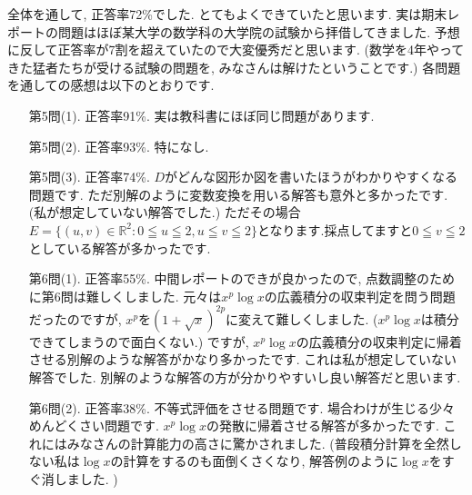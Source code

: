 \documentclass[dvipdfmx,a4paper,11pt]{article}
\newcommand{\R}{\mathbb{R}}
\theoremstyle{definition}
\begin{document}
\hspace{-11pt}{\Large 期末レポートについて}

全体を通して, 正答率72\%でした. とてもよくできていたと思います.
実は期末レポートの問題はほぼ某大学の数学科の大学院の試験から拝借してきました.
予想に反して正答率が7割を超えていたので大変優秀だと思います.
(数学を4年やってきた猛者たちが受ける試験の問題を, みなさんは解けたということです.)
各問題を通しての感想は以下のとおりです.
\begin{itemize}
\item [第5問(1).] 正答率91\%. 実は教科書にほぼ同じ問題があります.
\item [第5問(2).] 正答率93\%. 特になし.
\item [第5問(3).] 正答率74\%. $D$がどんな図形か図を書いたほうがわかりやすくなる問題です.
 ただ別解のように変数変換を用いる解答も意外と多かったです. (私が想定していない解答でした.) ただその場合$E=\{ (u ,v) \in \R^2 : 0 \leqq u \leqq 2,  u \leqq v \leqq 2\}$となります.採点してますと$0 \leqq v \leqq 2$としている解答が多かったです. 
\item [第6問(1).] 正答率55\%. 中間レポートのできが良かったので, 点数調整のために第6問は難しくしました. 
元々は$x^p \log x$の広義積分の収束判定を問う問題だったのですが, $x^p$を$(1+\sqrt{x})^{2p}$に変えて難しくしました. ($x^p \log x$は積分できてしまうので面白くない.)
ですが, $x^p \log x$の広義積分の収束判定に帰着させる別解のような解答がかなり多かったです. 
これは私が想定していない解答でした. 別解のような解答の方が分かりやすいし良い解答だと思います.
\item [第6問(2).] 正答率38\%. 不等式評価をさせる問題です. 場合わけが生じる少々めんどくさい問題です.
$x^p \log x$の発散に帰着させる解答が多かったです.
これにはみなさんの計算能力の高さに驚かされました.
(普段積分計算を全然しない私は$\log x$の計算をするのも面倒くさくなり, 解答例のように$\log x$をすぐ消しました. )
\end{itemize}

   \vspace{33pt}
   
\end{document}
